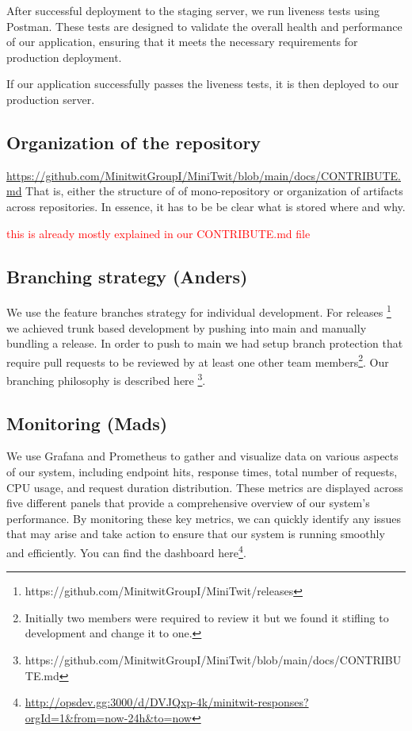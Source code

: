 \documentclass{article}
\begin{document}
{After successful deployment to the staging server, we run liveness tests using Postman. These tests are designed to validate the overall health and performance of our application, ensuring that it meets the necessary requirements for production deployment.

If our application successfully passes the liveness tests, it is then deployed to our production server.

\subsection{Organization of the repository}
\url{https://github.com/MinitwitGroupI/MiniTwit/blob/main/docs/CONTRIBUTE.md}
That is, either the structure of of mono-repository or organization of artifacts across repositories.
In essence, it has to be be clear what is stored where and why.

\textcolor{red}{this is already mostly explained in our CONTRIBUTE.md file}

\subsection{Branching strategy (Anders)}

We use the feature branches strategy for individual development. For releases \footnote{https://github.com/MinitwitGroupI/MiniTwit/releases} we achieved trunk based development by pushing into main and manually bundling a release. In order to push to main we had setup branch protection that require pull requests to be reviewed by at least one other team members\footnote{Initially two members were required to review it but we found it stifling to development and change it to one.}. Our branching philosophy is described here \footnote{https://github.com/MinitwitGroupI/MiniTwit/blob/main/docs/CONTRIBUTE.md}.

\subsection{Monitoring (Mads)}
We use Grafana and Prometheus to gather and visualize data on various aspects of our system, including endpoint hits, response times, total number of requests, CPU usage, and request duration distribution. These metrics are displayed across five different panels that provide a comprehensive overview of our system's performance. By monitoring these key metrics, we can quickly identify any issues that may arise and take action to ensure that our system is running smoothly and efficiently. You can find the dashboard here\footnote{\url{http://opsdev.gg:3000/d/DVJQxp-4k/minitwit-responses?orgId=1&from=now-24h&to=now}}.

}
\end{document}
